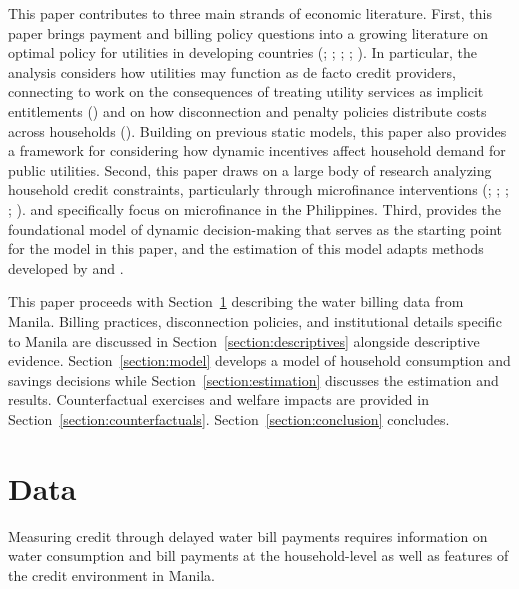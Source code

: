 \documentclass[12pt]{article}
\begin{document}
This paper contributes to three main strands of economic literature.  First, this paper brings payment and billing policy questions into a growing literature on optimal policy for utilities in developing countries (\cite{mcrae2015infrastructure}; \cite{szabo2015value}; \cite{jack2020charging}; \cite{jack2015pay}; \cite{szabo2015reducing}).  In particular, the analysis considers how utilities may function as de facto credit providers, connecting to work on the consequences of treating utility services as implicit entitlements (\cite{burgess2020consequences}) and on how disconnection and penalty policies distribute costs across households (\cite{cicala2021incidence}).  Building on previous static models, this paper also provides a framework for considering how dynamic incentives affect household demand for public utilities.  Second, this paper draws on a large body of research analyzing household credit constraints, particularly through microfinance interventions (\cite{morduch1999microfinance}; \cite{morduch1995income}; \cite{cull2009microfinance}; \cite{dupas2013savings}; \cite{jack2016borrowing}).  \cite{karlan2009expanding} and \cite{gine2014group} specifically focus on microfinance in the Philippines. Third, \cite{deaton1991saving} provides the foundational model of dynamic decision-making that serves as the starting point for the model in this paper, and the estimation of this model adapts methods developed by \cite{gourinchas2002consumption} and \cite{laibson2007estimating}.

This paper proceeds with Section~\ref{section:data} describing the water billing data from Manila.  Billing practices, disconnection policies, and institutional details specific to Manila are discussed in Section~\ref{section:descriptives} alongside descriptive evidence.  Section~\ref{section:model} develops a model of household consumption and savings decisions while Section~\ref{section:estimation} discusses the estimation and results.  Counterfactual exercises and welfare impacts are provided in Section~\ref{section:counterfactuals}.  Section~\ref{section:conclusion} concludes.

\section{Data}\label{section:data}

Measuring credit through delayed water bill payments requires information on water consumption and bill payments at the household-level as well as features of the credit environment in Manila.
\end{document}
